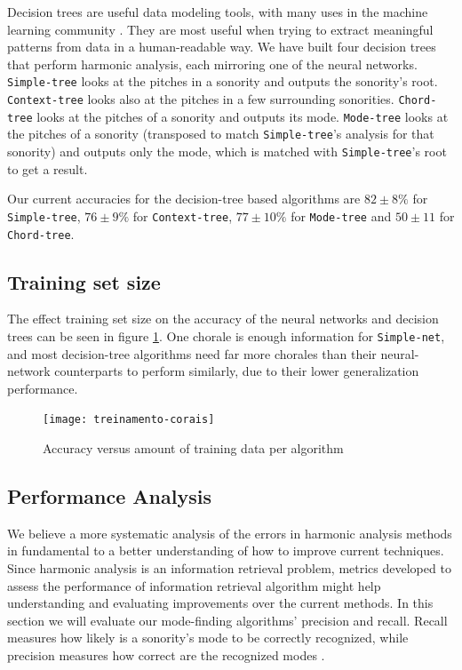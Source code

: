 \documentclass{article}
\begin{document}
Decision trees are useful data modeling tools, with many uses in the
machine learning community \cite{Mitchell:1997:ML,
  russell02:aima}. They are most useful when trying to extract
meaningful patterns from data in a human-readable way. We have built
four decision trees that perform harmonic analysis, each mirroring one
of the neural networks. \texttt{Simple-tree} looks at the pitches in a
sonority and outputs the sonority's root. \texttt{Context-tree} looks
also at the pitches in a few surrounding
sonorities. \texttt{Chord-tree} looks at the pitches of a sonority and
outputs its mode. \texttt{Mode-tree} looks at the pitches of a
sonority (transposed to match \texttt{Simple-tree}'s analysis for that
sonority) and outputs only the mode, which is matched with
\texttt{Simple-tree}'s root to get a result.

Our current accuracies for the decision-tree based algorithms are $82
\pm 8\%$ for \texttt{Simple-tree}, $76 \pm 9\%$ for
\texttt{Context-tree}, $77 \pm 10\%$ for \texttt{Mode-tree} and $50
\pm 11$ for \texttt{Chord-tree}.

\subsection{Training set size}

The effect training set size on the accuracy of the neural networks
and decision trees can be seen in figure
\ref{fig:treinamento-corais}. One chorale is enough information for
\texttt{Simple-net}, and most decision-tree algorithms need far more
chorales than their neural-network counterparts to perform similarly,
due to their lower generalization performance.

\begin{figure}
  \texttt{[image: treinamento-corais]}
  \caption{Accuracy versus amount of training data per algorithm}
  \label{fig:treinamento-corais}
\end{figure}


\subsection{Performance Analysis}
\label{sec:common-errors}

We believe a more systematic analysis of the errors in harmonic
analysis methods in fundamental to a better understanding of how to
improve current techniques. Since harmonic analysis is an information
retrieval problem, metrics developed to assess the performance of
information retrieval algorithm might help understanding and
evaluating improvements over the current methods. In this section we
will evaluate our mode-finding algorithms' precision and
recall. Recall measures how likely is a sonority's mode to be
correctly recognized, while precision measures how correct are the
recognized modes \cite{russell02:aima}. 
\end{document}
